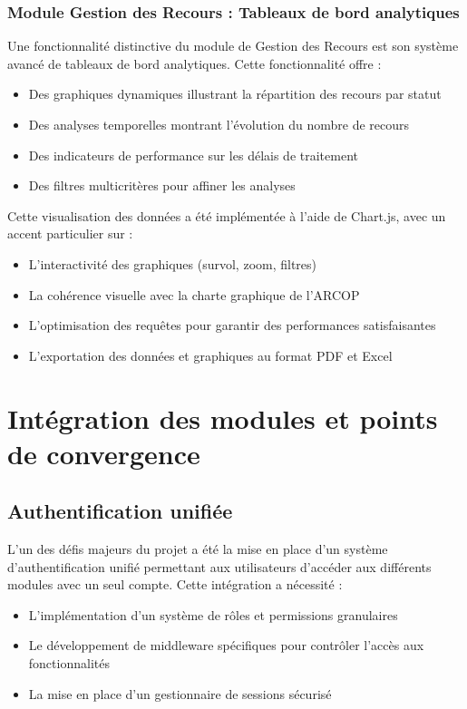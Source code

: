 \subsubsection{Module Gestion des Recours : Tableaux de bord analytiques}
Une fonctionnalité distinctive du module de Gestion des Recours est son système avancé de tableaux de bord analytiques. Cette fonctionnalité offre :

\begin{itemize}
    \item Des graphiques dynamiques illustrant la répartition des recours par statut
    \item Des analyses temporelles montrant l'évolution du nombre de recours
    \item Des indicateurs de performance sur les délais de traitement
    \item Des filtres multicritères pour affiner les analyses
\end{itemize}

Cette visualisation des données a été implémentée à l'aide de Chart.js, avec un accent particulier sur :

\begin{itemize}
    \item L'interactivité des graphiques (survol, zoom, filtres)
    \item La cohérence visuelle avec la charte graphique de l'ARCOP
    \item L'optimisation des requêtes pour garantir des performances satisfaisantes
    \item L'exportation des données et graphiques au format PDF et Excel
\end{itemize}

\section{Intégration des modules et points de convergence}

\subsection{Authentification unifiée}
L'un des défis majeurs du projet a été la mise en place d'un système d'authentification unifié permettant aux utilisateurs d'accéder aux différents modules avec un seul compte. Cette intégration a nécessité :

\begin{itemize}
    \item L'implémentation d'un système de rôles et permissions granulaires
    \item Le développement de middleware spécifiques pour contrôler l'accès aux fonctionnalités
    \item La mise en place d'un gestionnaire de sessions sécurisé
\end{itemize}

